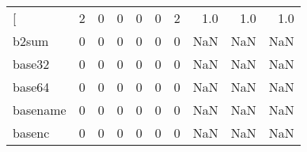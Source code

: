 \begin{longtable}{lrrrrrrrrr}
\bottomrule
\endlastfoot
{[}         &                                       2 &                                                  0 &                                                  0 &                                                  0 &                                                  0 &                                                  2 &                                                1.0 &                                    1.0 &                                  1.0 \\
b2sum     &                                       0 &                                                  0 &                                                  0 &                                                  0 &                                                  0 &                                                  0 &                                                NaN &                                    NaN &                                  NaN \\
base32    &                                       0 &                                                  0 &                                                  0 &                                                  0 &                                                  0 &                                                  0 &                                                NaN &                                    NaN &                                  NaN \\
base64    &                                       0 &                                                  0 &                                                  0 &                                                  0 &                                                  0 &                                                  0 &                                                NaN &                                    NaN &                                  NaN \\
basename  &                                       0 &                                                  0 &                                                  0 &                                                  0 &                                                  0 &                                                  0 &                                                NaN &                                    NaN &                                  NaN \\
basenc    &                                       0 &                                                  0 &                                                  0 &                                                  0 &                                                  0 &                                                  0 &                                                NaN &                                    NaN &                                  NaN \\

\end{longtable}
